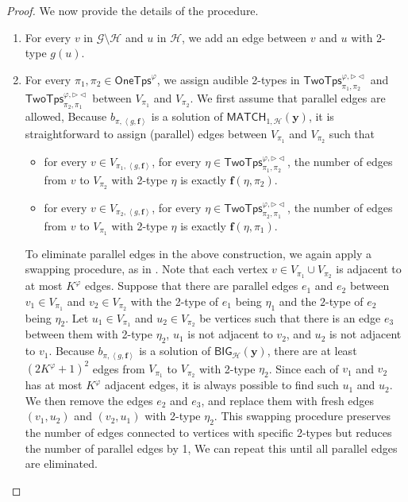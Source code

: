 \documentclass[10pt,a4paper]{article}
\theoremstyle{definition}
\theoremstyle{remark}
\newcommand{\cG}{\mathcal{G}}
\newcommand{\cH}{\mathcal{H}}
\newcommand{\cK}{\mathsf{TwoTps}}
\newcommand{\bff}{\mathbf{f}}
\newcommand{\bfy}{\mathbf{y}}
\newcommand{\onetypes}{\mathsf{OneTps}}
\newcommand{\tuple}[1]       {\left\langle #1 \right\rangle}
\newcommand{\trif} {\triangleright}
\newcommand{\trib} {\triangleleft}
\newcommand{\cKvpfb}    {\cK^{\varphi, \trif\trib}}
\newcommand{\bige}  {\mathsf{BIG}}
\newcommand{\match} {\mathsf{MATCH}}
\begin{document}
\begin{proof}
    We now provide the details of the procedure.
    \begin{enumerate}
        \item 
            For every $v$ in $\cG \setminus \cH$  and $u$ in $\cH$,
            we add an edge between $v$ and $u$ with 2-type $g(u)$.
        \item
            For every $\pi_1, \pi_2 \in \onetypes^\varphi$,
            we assign audible 2-types in $\cKvpfb_{\pi_1, \pi_2}$ and $\cKvpfb_{\pi_2, \pi_1}$
            between $V_{\pi_1}$ and $V_{\pi_2}$.
            We first assume that parallel edges are allowed,
            Because $b_{\pi, \tuple{g, \bff}}$ is a solution of $\match_{1, \cH}(\bfy)$,
            it is straightforward to assign (parallel) edges between $V_{\pi_1}$ and $V_{\pi_2}$ 
            such that
            \begin{itemize}
            \item
                for every $v \in V_{\pi_1, \tuple{g, \bff}}$, for every $\eta \in \cKvpfb_{\pi_1, \pi_2}$,
                the number of edges from $v$ to $V_{\pi_2}$ with 2-type $\eta$ is exactly $\bff(\eta, \pi_2)$.
            \item
                for every $v \in V_{\pi_2, \tuple{g, \bff}}$, for every $\eta \in \cKvpfb_{\pi_2, \pi_1}$,
                the number of edges from $v$ to $V_{\pi_1}$ with 2-type $\eta$ is exactly $\bff(\eta, \pi_1)$.
            \end{itemize}

            To eliminate parallel edges in the above construction,
            we again apply a swapping procedure, as in \cite{tonyeryk,ultimatelyperiodic}.
            Note that each vertex $v \in V_{\pi_1} \cup V_{\pi_2}$ is adjacent to at most $K^\varphi$ edges.
            Suppose that there are parallel edges $e_1$ and $e_2$
            between $v_1 \in V_{\pi_1}$ and $v_2 \in V_{\pi_2}$ with the 2-type of $e_1$ being $\eta_1$ and
            the $2$-type of $e_2$ being $\eta_2$.
            Let $u_1 \in V_{\pi_1}$ and $u_2 \in V_{\pi_2}$ be vertices such that
            there is an edge $e_3$ between them with 2-type $\eta_2$,
            $u_1$ is not adjacent to $v_2$, and
            $u_2$ is not adjacent to $v_1$.
            Because $b_{\pi, \tuple{g, \bff}}$ is a solution of $\bige_{\cH}(\bfy)$,
            there are at least $(2K^\varphi+1)^2$ edges from $V_{\pi_1}$ to $V_{\pi_2}$ with 2-type $\eta_2$.
            Since each of $v_1$ and $v_2$ has at most $K^\varphi$ adjacent edges,
            it is always possible to find such $u_1$ and $u_2$.
            We then remove the edges $e_2$ and $e_3$,
            and replace them with fresh edges $(v_1, u_2)$ and $(v_2, u_1)$ with 2-type $\eta_2$.
            This swapping procedure preserves the number of edges connected to vertices with specific 2-types
            but reduces the number of parallel edges by 1,
            We can repeat this until all parallel edges are eliminated.


\end{enumerate}
\end{proof}
\end{document}
